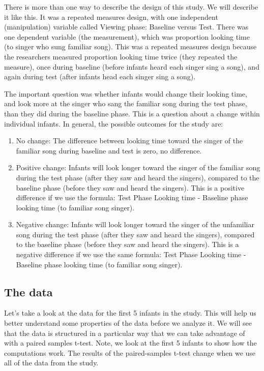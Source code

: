 \documentclass[
  letterpaper,
  DIV=11,
  numbers=noendperiod]{scrreprt}
\begin{document}
There is more than one way to describe the design of this study. We will
describe it like this. It was a repeated measures design, with one
independent (manipulation) variable called Viewing phase: Baseline
versus Test. There was one dependent variable (the measurement), which
was proportion looking time (to singer who sung familiar song). This was
a repeated measures design because the researchers measured proportion
looking time twice (they repeated the measure), once during baseline
(before infants heard each singer sing a song), and again during test
(after infants head each singer sing a song).

The important question was whether infants would change their looking
time, and look more at the singer who sang the familiar song during the
test phase, than they did during the baseline phase. This is a question
about a change within individual infants. In general, the possible
outcomes for the study are:

\begin{enumerate}
\def\labelenumi{\arabic{enumi}.}
\item
  No change: The difference between looking time toward the singer of
  the familiar song during baseline and test is zero, no difference.
\item
  Positive change: Infants will look longer toward the singer of the
  familiar song during the test phase (after they saw and heard the
  singers), compared to the baseline phase (before they saw and heard
  the singers). This is a positive difference if we use the formula:
  Test Phase Looking time - Baseline phase looking time (to familiar
  song singer).
\item
  Negative change: Infants will look longer toward the singer of the
  unfamiliar song during the test phase (after they saw and heard the
  singers), compared to the baseline phase (before they saw and heard
  the singers). This is a negative difference if we use the same
  formula: Test Phase Looking time - Baseline phase looking time (to
  familiar song singer).
\end{enumerate}

\subsection{The data}\label{the-data}

Let's take a look at the data for the first 5 infants in the study. This
will help us better understand some properties of the data before we
analyze it. We will see that the data is structured in a particular way
that we can take advantage of with a paired samples t-test. Note, we
look at the first 5 infants to show how the computations work. The
results of the paired-samples t-test change when we use all of the data
from the study.
\end{document}
